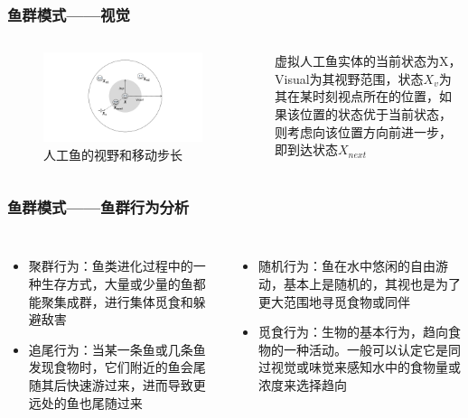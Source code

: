 \begin{frame}
	\frametitle{鱼群模式——视觉}
	\begin{columns}
		\begin{figure}
			\centering
			\includegraphics[width=0.9\textwidth]{pic/fish1.pdf}
			\caption{人工鱼的视野和移动步长}
		\end{figure}
	虚拟人工鱼实体的当前状态为X，Visual为其视野范围，状态$X_v$为其在某时刻视点所在的位置，如果该位置的状态优于当前状态，则考虑向该位置方向前进一步，即到达状态$X_{next}$
	\end{columns}
\end{frame}

\begin{frame}
	\frametitle{鱼群模式——鱼群行为分析}
	\begin{columns}
	\column{.5\textwidth}
		\begin{itemize}
			\item{聚群行为：鱼类进化过程中的一种生存方式，大量或少量的鱼都能聚集成群，进行集体觅食和躲避敌害}
			\item{追尾行为：当某一条鱼或几条鱼发现食物时，它们附近的鱼会尾随其后快速游过来，进而导致更远处的鱼也尾随过来}
		\end{itemize}
	\column{.5\textwidth}
		\begin{itemize}
			\item{随机行为：鱼在水中悠闲的自由游动，基本上是随机的，其视也是为了更大范围地寻觅食物或同伴}
			\item{觅食行为：生物的基本行为，趋向食物的一种活动。一般可以认定它是同过视觉或味觉来感知水中的食物量或浓度来选择趋向}
		\end{itemize}
	\end{columns}
\end{frame}

